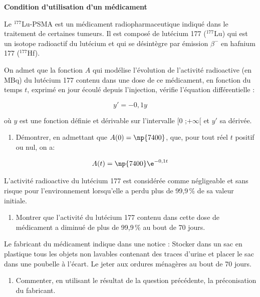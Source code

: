 \begin{center}
\textbf{Condition d'utilisation d'un médicament}
\end{center}

Le $^{177}$Lu-PSMA est un médicament radiopharmaceutique indiqué dans le traitement
de certaines tumeurs. Il est composé de lutécium 177 ($^{177}$Lu) qui est un isotope
radioactif du lutécium et qui se désintègre par émission $\beta^-$ en hafnium 177 ($^{177}$Hf).

On admet que la fonction $A$ qui modélise l'évolution de l'activité radioactive (en MBq) du lutécium 177 contenu dans une dose de ce médicament, en fonction du temps $t$, exprimé en jour écoulé depuis l'injection, vérifie l'équation différentielle :

\[y' = -0,1y\]

où $y$ est une fonction définie et dérivable sur l'intervalle [0 ;$ +\infty$[ et $y'$ sa dérivée.

\begin{enumerate}[start=7]
\item  Démontrer, en admettant que $A(0) = \np{7400}$, que, pour tout réel $t$ positif ou nul,
on a:
\end{enumerate}

\[A(t)=\np{7400}\e^{-0,1t}\]

L'activité radioactive du lutécium 177 est considérée comme négligeable et sans
risque pour l'environnement lorsqu'elle a perdu plus de 99,9\,\% de sa valeur initiale.
\begin{enumerate}[resume]
\item Montrer que l'activité du lutécium 177 contenu dans cette dose de médicament a
diminué de plus de 99,9\,\% au bout de 70 jours.
\end{enumerate}
Le fabricant du médicament indique dans une notice : \og Stocker dans un sac en
plastique tous les objets non lavables contenant des traces d'urine et placer le sac
dans une poubelle à l'écart. Le jeter aux ordures ménagères au bout de 70 jours\fg.

\begin{enumerate}[resume]
 \item Commenter, en utilisant le résultat de la question précédente, la préconisation du
fabricant.
\end{enumerate}

\bigskip
